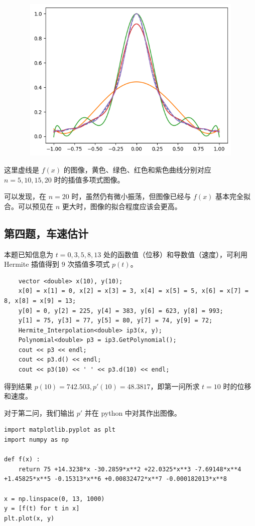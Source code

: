 \documentclass{ctexart}
\begin{document}
\begin{figure}[h]
    \begin{minipage}{4cm}
	\includegraphics[width = 12cm, height = 8cm]{3.png}
	\label{fig2}
	\end{minipage}
\end{figure}

这里虚线是 $f(x)$ 的图像，黄色、绿色、红色和紫色曲线分别对应 $n=5,10,15,20$ 时的插值多项式图像。

可以发现，在 $n=20$ 时，虽然仍有微小振荡，但图像已经与 $f(x)$ 基本完全拟合。可以预见在 $n$ 更大时，图像的拟合程度应该会更高。

\subsection{第四题，车速估计}
本题已知信息为 $t=0,3,5,8,13$ 处的函数值（位移）和导数值（速度），可利用 Hermite 插值得到 $9$ 次插值多项式 $p(t)$。

\begin{verbatim}
    vector <double> x(10), y(10);
    x[0] = x[1] = 0, x[2] = x[3] = 3, x[4] = x[5] = 5, x[6] = x[7] = 8, x[8] = x[9] = 13;
    y[0] = 0, y[2] = 225, y[4] = 383, y[6] = 623, y[8] = 993;
    y[1] = 75, y[3] = 77, y[5] = 80, y[7] = 74, y[9] = 72;
    Hermite_Interpolation<double> ip3(x, y);
    Polynomial<double> p3 = ip3.GetPolynomial();
    cout << p3 << endl;
    cout << p3.d() << endl;
    cout << p3(10) << ' ' << p3.d(10) << endl;
\end{verbatim}

得到结果 $p(10)=742.503,p'(10)=48.3817$，即第一问所求 $t=10$ 时的位移和速度。

对于第二问，我们输出 $p'$ 并在 python 中对其作出图像。

\begin{verbatim}
import matplotlib.pyplot as plt
import numpy as np

def f(x) :
    return 75 +14.3238*x -30.2859*x**2 +22.0325*x**3 -7.69148*x**4 +1.45825*x**5 -0.15313*x**6 +0.00832472*x**7 -0.000182013*x**8

x = np.linspace(0, 13, 1000)
y = [f(t) for t in x]
plt.plot(x, y)
\end{verbatim}
\end{document}
